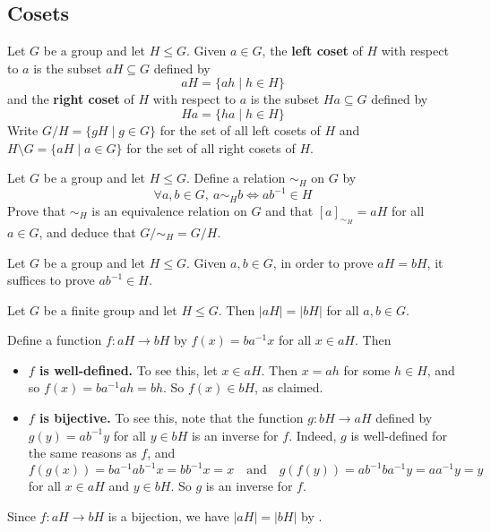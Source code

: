 \subsection*{Cosets}

\begin{definition}
\label{defCoset}
Let $G$ be a group and let $H \le G$. Given $a \in G$, the \textbf{left coset} of $H$ with respect to $a$ is the subset $aH \subseteq G$ defined by
\[ aH = \{ ah \mid h \in H \} \]
and the \textbf{right coset} of $H$ with respect to $a$ is the subset $Ha \subseteq G$ defined by
\[ Ha = \{ ha \mid h \in H \} \]
Write $G / H = \{ gH \mid g \in G \}$ for the set of all left cosets of $H$ and $H \setminus G = \{ aH \mid a \in G \}$ for the set of all right cosets of $H$.
\end{definition}

\todo{}

\begin{exercise}
\label{exCosetEquivalenceRelation}
Let $G$ be a group and let $H \le G$. Define a relation $\sim_H$ on $G$ by
\[\forall a,b \in G,~ a \sim_H b \Leftrightarrow ab^{-1} \in H \]
Prove that $\sim_H$ is an equivalence relation on $G$ and that $[a]_{\sim_H} = aH$ for all $a \in G$, and deduce that $G/{\sim_H} = G/H$.
\end{exercise}

\begin{strategy}
\label{strProvingCosetsAreEqual}
Let $G$ be a group and let $H \le G$. Given $a,b \in G$, in order to prove $aH = bH$, it suffices to prove $ab^{-1} \in H$.
\end{strategy}

\begin{lemma}
\label{lemCosetsHaveEqualSize}
Let $G$ be a finite group and let $H \le G$. Then $|aH| = |bH|$ for all $a,b \in G$.
\end{lemma}

\begin{cproof}
Define a function $f : aH \to bH$ by $f(x) = ba^{-1}x$ for all $x \in aH$. Then
\begin{itemize}
\item \textbf{$f$ is well-defined.} To see this, let $x \in aH$. Then $x=ah$ for some $h \in H$, and so $f(x) = ba^{-1}ah = bh$. So $f(x) \in bH$, as claimed.
\item \textbf{$f$ is bijective.} To see this, note that the function $g : bH \to aH$ defined by $g(y) = ab^{-1}y$ for all $y \in bH$ is an inverse for $f$. Indeed, $g$ is well-defined for the same reasons as $f$, and
\[ f(g(x)) = ba^{-1}ab^{-1}x = bb^{-1}x = x \quad \text{and} \quad g(f(y)) = ab^{-1}ba^{-1}y = aa^{-1}y = y\]
for all $x \in aH$ and $y \in bH$. So $g$ is an inverse for $f$.
\end{itemize}

Since $f : aH \to bH$ is a bijection, we have $|aH| = |bH|$ by .
\end{cproof}

